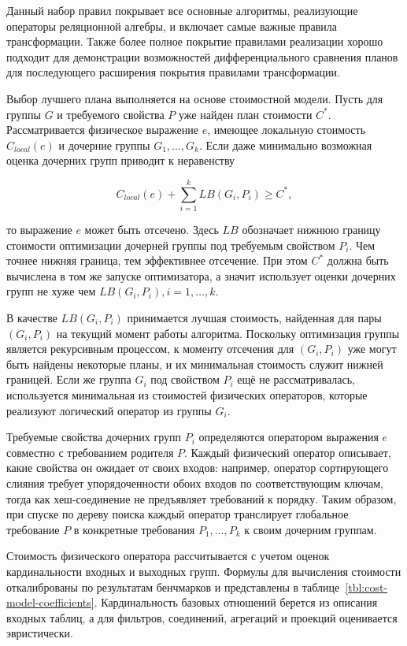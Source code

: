 \documentclass[14pt, russian]{scrartcl}
\begin{document}
Данный набор правил покрывает все основные алгоритмы, реализующие операторы
реляционной алгебры, и включает самые важные правила трансформации. Также более
полное покрытие правилами реализации хорошо подходит для демонстрации
возможностей дифференциального сравнения планов для последующего расширения
покрытия правилами трансформации.

Выбор лучшего плана выполняется на основе стоимостной модели. Пусть для группы
\(G\) и требуемого свойства \(P\) уже найден план стоимости \(C^*\).
Рассматривается физическое выражение \(e\), имеющее локальную стоимость
\(C_{local}(e)\) и дочерние группы \(G_1, \ldots, G_k\). Если даже минимально
возможная оценка дочерних групп приводит к неравенству

\[
    C_{local}(e) + \sum_{i=1}^{k} LB(G_i, P_i) \geq C^*,
\]

\noindent{}то выражение \(e\) может быть отсечено. Здесь \(LB\) обозначает
нижнюю границу стоимости оптимизации дочерней группы под требуемым свойством
\(P_i\). Чем точнее нижняя граница, тем эффективнее отсечение. При этом \(C^{*}\)
должна быть вычислена в том же запуске оптимизатора, а значит использует оценки
дочерних групп не хуже чем \(LB(G_{i}, P_{i}), i=1, \ldots{} ,k\).

В качестве \(LB(G_i, P_i)\) принимается лучшая стоимость, найденная для пары
\((G_i, P_i)\) на текущий момент работы алгоритма. Поскольку оптимизация группы
является рекурсивным процессом, к моменту отсечения для \((G_i, P_i)\) уже могут
быть найдены некоторые планы, и их минимальная стоимость служит нижней границей.
Если же группа \(G_i\) под свойством \(P_i\) ещё не рассматривалась,
используется минимальная из стоимостей физических операторов, которые реализуют
логический оператор из группы \(G_{i}\).

Требуемые свойства дочерних групп \(P_i\) определяются оператором выражения
\(e\) совместно с требованием родителя \(P\). Каждый физический оператор
описывает, какие свойства он ожидает от своих входов: например, оператор
сортирующего слияния требует упорядоченности обоих входов по соответствующим
ключам, тогда как хеш-соединение не предъявляет требований к порядку. Таким
образом, при спуске по дереву поиска каждый оператор транслирует глобальное
требование \(P\) в конкретные требования \(P_1, \ldots, P_k\) к своим дочерним
группам.

Стоимость физического оператора рассчитывается с учетом оценок кардинальности
входных и выходных групп. Формулы для вычисления стоимости откалиброваны по
результатам бенчмарков и представлены в
таблице~\ref{tbl:cost-model-coefficients}. Кардинальность базовых отношений
берется из описания входных таблиц, а для фильтров, соединений, агрегаций и
проекций оценивается эвристически.
\end{document}
